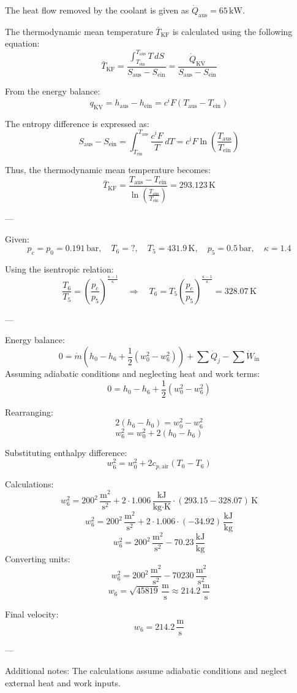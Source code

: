 The heat flow removed by the coolant is given as \( \dot{Q}_{\text{aus}} = 65 \, \text{kW} \).  

The thermodynamic mean temperature \( \bar{T}_{\text{KF}} \) is calculated using the following equation:  
\[
\bar{T}_{\text{KF}} = \frac{\int_{T_{\text{ein}}}^{T_{\text{aus}}} T \, dS}{S_{\text{aus}} - S_{\text{ein}}} = \frac{\dot{Q}_{\text{KV}}}{S_{\text{aus}} - S_{\text{ein}}}
\]

From the energy balance:  
\[
q_{\text{KV}} = h_{\text{aus}} - h_{\text{ein}} = c^i F (T_{\text{aus}} - T_{\text{ein}})
\]

The entropy difference is expressed as:  
\[
S_{\text{aus}} - S_{\text{ein}} = \int_{T_{\text{ein}}}^{T_{\text{aus}}} \frac{c^i F}{T} \, dT = c^i F \ln \left( \frac{T_{\text{aus}}}{T_{\text{ein}}} \right)
\]

Thus, the thermodynamic mean temperature becomes:  
\[
\bar{T}_{\text{KF}} = \frac{T_{\text{aus}} - T_{\text{ein}}}{\ln \left( \frac{T_{\text{aus}}}{T_{\text{ein}}} \right)} = 293.123 \, \text{K}
\]

---

Given:  
\[
p_c = p_0 = 0.191 \, \text{bar}, \quad T_6 = ?, \quad T_5 = 431.9 \, \text{K}, \quad p_5 = 0.5 \, \text{bar}, \quad \kappa = 1.4
\]  

Using the isentropic relation:  
\[
\frac{T_6}{T_5} = \left( \frac{p_c}{p_5} \right)^{\frac{\kappa - 1}{\kappa}} \quad \Rightarrow \quad T_6 = T_5 \left( \frac{p_c}{p_5} \right)^{\frac{\kappa - 1}{\kappa}} = 328.07 \, \text{K}
\]  

---

Energy balance:  
\[
0 = \dot{m} \left( h_0 - h_6 + \frac{1}{2} \left( w_0^2 - w_6^2 \right) \right) + \sum \dot{Q}_j - \sum \dot{W}_{\text{in}}
\]  
Assuming adiabatic conditions and neglecting heat and work terms:  
\[
0 = h_0 - h_6 + \frac{1}{2} \left( w_0^2 - w_6^2 \right)
\]  

Rearranging:  
\[
2 \left( h_6 - h_0 \right) = w_0^2 - w_6^2
\]  
\[
w_6^2 = w_0^2 + 2 \left( h_0 - h_6 \right)
\]  

Substituting enthalpy difference:  
\[
w_6^2 = w_0^2 + 2 c_{p,\text{air}} \left( T_0 - T_6 \right)
\]  

Calculations:  
\[
w_6^2 = 200^2 \, \frac{\text{m}^2}{\text{s}^2} + 2 \cdot 1.006 \, \frac{\text{kJ}}{\text{kg·K}} \cdot \left( 293.15 - 328.07 \right) \, \text{K}
\]  
\[
w_6^2 = 200^2 \, \frac{\text{m}^2}{\text{s}^2} + 2 \cdot 1.006 \cdot (-34.92) \, \frac{\text{kJ}}{\text{kg}}
\]  
\[
w_6^2 = 200^2 \, \frac{\text{m}^2}{\text{s}^2} - 70.23 \, \frac{\text{kJ}}{\text{kg}}
\]  
Converting units:  
\[
w_6^2 = 200^2 \, \frac{\text{m}^2}{\text{s}^2} - 70230 \, \frac{\text{m}^2}{\text{s}^2}
\]  
\[
w_6 = \sqrt{45819} \, \frac{\text{m}}{\text{s}} \approx 214.2 \, \frac{\text{m}}{\text{s}}
\]  

Final velocity:  
\[
w_6 = 214.2 \, \frac{\text{m}}{\text{s}}
\]  

---

Additional notes:  
The calculations assume adiabatic conditions and neglect external heat and work inputs.